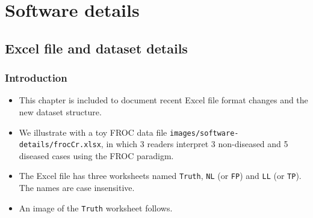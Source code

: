 \documentclass[
]{book}
\providecommand{\tightlist}{%
  \setlength{\itemsep}{0pt}\setlength{\parskip}{0pt}}
\begin{document}
\hypertarget{part-software-details}{%
\part*{Software details}\label{part-software-details}}

\hypertarget{dataset-object-details}{%
\chapter{Excel file and dataset details}\label{dataset-object-details}}

\hypertarget{introduction-3}{%
\section{Introduction}\label{introduction-3}}

\begin{itemize}
\tightlist
\item
  This chapter is included to document recent Excel file format changes and the new dataset structure.
\item
  We illustrate with a toy FROC data file \texttt{images/software-details/frocCr.xlsx}, in which 3 readers interpret 3 non-diseased and 5 diseased cases using the FROC paradigm.
\item
  The Excel file has three worksheets named \texttt{Truth}, \texttt{NL} (or \texttt{FP}) and \texttt{LL} (or \texttt{TP}). The names are case insensitive.
\item
  An image of the \texttt{Truth} worksheet follows.
\end{itemize}
\end{document}
